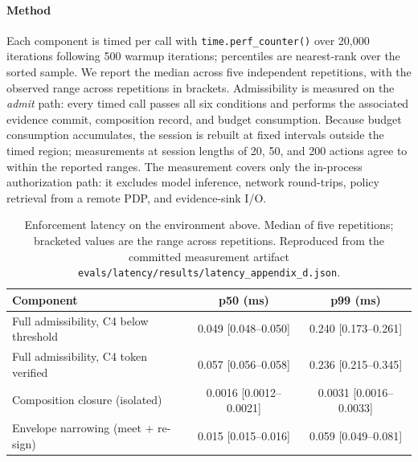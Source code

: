 \documentclass[sigconf,nonacm]{acmart}
\begin{document}
\paragraph{Method} Each component is timed per call with \texttt{time.\allowbreak perf\_\allowbreak counter()} over 20{,}000 iterations following 500 warmup iterations; percentiles are nearest-rank over the sorted sample. We report the median across five independent repetitions, with the observed range across repetitions in brackets. Admissibility is measured on the \emph{admit} path: every timed call passes all six conditions and performs the associated evidence commit, composition record, and budget consumption. Because budget consumption accumulates, the session is rebuilt at fixed intervals outside the timed region; measurements at session lengths of 20, 50, and 200 actions agree to within the reported ranges. The measurement covers only the in-process authorization path: it excludes model inference, network round-trips, policy retrieval from a remote PDP, and evidence-sink I/O.

\begin{table}[H]
\centering
\footnotesize
\caption{Enforcement latency on the environment above. Median of five repetitions; bracketed values are the range across repetitions. Reproduced from the committed measurement artifact \texttt{evals/latency/results/latency\_appendix\_d.json}.}
\label{tab:latency}
\begin{tabularx}{\linewidth}{@{}Xcc@{}}
\toprule
\textbf{Component} & \textbf{p50 (ms)} & \textbf{p99 (ms)} \\
\midrule
Full admissibility, C4 below threshold & 0.049 [0.048--0.050] & 0.240 [0.173--0.261] \\
Full admissibility, C4 token verified & 0.057 [0.056--0.058] & 0.236 [0.215--0.345] \\
Composition closure (isolated) & 0.0016 [0.0012--0.0021] & 0.0031 [0.0016--0.0033] \\
Envelope narrowing (meet + re-sign) & 0.015 [0.015--0.016] & 0.059 [0.049--0.081] \\
\bottomrule
\end{tabularx}
\end{table}
\end{document}
